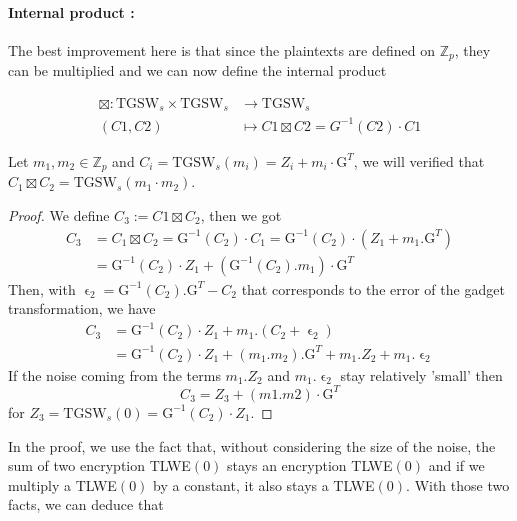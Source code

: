 \documentclass{article}
\newcommand{\Z}{\mathbb{Z}}
\theoremstyle{definition}
\theoremstyle{Theorem}
\begin{document}
\paragraph{Internal product :}
The best improvement here is that since the plaintexts are defined on $\Z_p$, they can be multiplied and we can now define the internal product

\begin{align*}
  \boxtimes \colon \text{TGSW}_s \times \text{TGSW}_s &\to \text{TGSW}_s\\
  (C1,C2) &\mapsto C1\boxtimes C2 = G^{-1}(C2)\cdot C1
\end{align*}

Let $m_1,m_2\in\Z_p$ and $C_i=\text{TGSW}_s(m_i) = Z_i + m_i \cdot \text{G}^T$, we will verified that $C_1\boxtimes C_2 = \text{TGSW}_s(m_1\cdot m_2)$.
\begin{proof}
    We define $C_3 := C1 \boxtimes C_2$, then we got
    \begin{equation}
    \begin{split}
    C_3 &= C_1\boxtimes C_2 = \text{G}^{-1}(C_2) \cdot C_1 = \text{G}^{-1}(C_2) \cdot (Z_1 + m_1.\text{G}^T) \\
    &= \text{G}^{-1}(C_2) \cdot Z_1 + (\text{G}^{-1}(C_2) . m_1) \cdot \text{G}^T
    \end{split}
    \end{equation}
    Then, with $\upvarepsilon_2 = \text{G}^{-1}(C_2).\text{G}^T - C_2$ that corresponds to the error of the gadget transformation, we have 
    \begin{equation}
    \begin{split}
        C_3 &= \text{G}^{-1}(C_2)\cdot Z_1 + m_1.(C_2 + \upvarepsilon_2)\\
        &= \text{G}^{-1}(C_2)\cdot Z_1 + (m_1.m_2).\text{G}^{T} + m_1.Z_2 + m_1.\upvarepsilon_2
    \end{split}
    \end{equation}
    If the noise coming from the terms $m_1.Z_2$ and $m_1.\upvarepsilon_2$ stay relatively 'small' then $$C_3 = Z_3 + (m1.m2) \cdot \text{G}^{T}$$
    for $Z_3 = \text{TGSW}_s(0) = \text{G}^{-1}(C_2)\cdot Z_1$.
    
    
\end{proof}

In the proof, we use the fact that, without considering the size of the noise, the sum of two encryption TLWE$(0)$ stays an encryption TLWE$(0)$ and if we multiply a TLWE$(0)$ by a constant, it also stays a TLWE$(0)$. With those two facts, we can deduce that 
\end{document}
